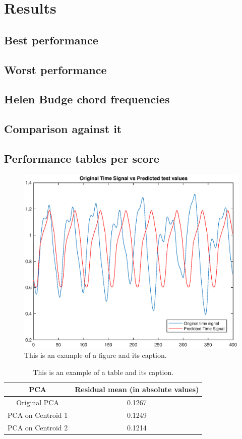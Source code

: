 \chapter{Results}

\section{Best performance}
\section{Worst performance}
\section{Helen Budge chord frequencies}
\section{Comparison against it}
\section{Performance tables per score}


\begin{figure}[!ht]
\includegraphics[clip,width=\columnwidth]{Figures/PlotTimeSeriesResult}%
\caption{This is an example of a figure and its caption.}
\label{fig:timeseries}
\end{figure}

\begin{table}[!ht]
\renewcommand{\arraystretch}{1.50}
\caption{This is an example of a table and its caption.}
\label{tablePCA}
\centering
\begin{tabular}{| c | c |}
\hline
\bfseries PCA & \bfseries Residual mean (in absolute values) \\
\hline\hline
Original PCA & 0.1267  \\
\hline
PCA on Centroid 1 & 0.1249\\
\hline
PCA on Centroid 2 & 0.1214  \\
\hline
\end{tabular}
\end{table}

\newpage
